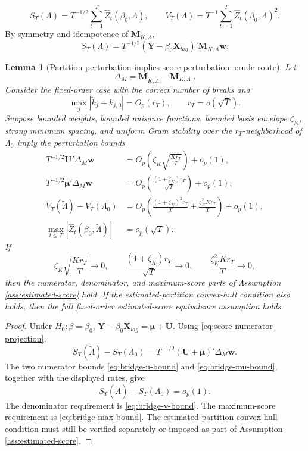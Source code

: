 \documentclass[12pt]{article}
\numberwithin{equation}{section}
\newtheorem{lemma}{Lemma}
\theoremstyle{definition}
\begin{document}
\[
    S_T(\Lambda)
    =
    T^{-1/2}\sum_{t=1}^T\widehat Z_t(\beta_0,\Lambda),
    \qquad
    V_T(\Lambda)
    =
    T^{-1}\sum_{t=1}^T\widehat Z_t(\beta_0,\Lambda)^2.
\]
By symmetry and idempotence of \(\bm M_{K,\Lambda}\),
\begin{equation}
    S_T(\Lambda)
    =
    T^{-1/2}
    (\bm Y-\beta_0\bm X_{lag})'\bm M_{K,\Lambda}\bm w.
    \label{eq:score-numerator-projection}
\end{equation}

\begin{lemma}[Partition perturbation implies score perturbation: crude route]
\label{lem:partition-perturbation}
Let
\[
    \Delta_M
    =
    \bm M_{K,\widetilde\Lambda}-\bm M_{K,\Lambda_0}.
\]
Consider the fixed-order case with the correct number of breaks and
\[
    \max_j|\widetilde k_j-k_{j,0}|=O_p(r_T),
    \qquad
    r_T=o(\sqrt T).
\]
Suppose bounded weights, bounded nuisance functions, bounded basis envelope \(\zeta_K\), strong minimum spacing, and uniform Gram stability over the \(r_T\)-neighborhood of \(\Lambda_0\) imply the perturbation bounds
\begin{align}
    T^{-1/2}\bm U'\Delta_M\bm w
    &=
    O_p\!\left(\zeta_K\sqrt{\frac{K r_T}{T}}\right)+o_p(1),
    \label{eq:bridge-u-bound}\\
    T^{-1/2}\bm\mu'\Delta_M\bm w
    &=
    O_p\!\left(\frac{(1+\zeta_K)r_T}{\sqrt T}\right)+o_p(1),
    \label{eq:bridge-mu-bound}\\
    V_T(\widetilde\Lambda)-V_T(\Lambda_0)
    &=
    O_p\!\left(
      \frac{(1+\zeta_K)^2r_T}{T}
      +
      \frac{\zeta_K^2K r_T}{T}
    \right)+o_p(1),
    \label{eq:bridge-v-bound}\\
    \max_{t\leq T}|\widehat Z_t(\beta_0,\widetilde\Lambda)|
    &=o_p(\sqrt T).
    \label{eq:bridge-max-bound}
\end{align}
If
\[
    \zeta_K\sqrt{\frac{K r_T}{T}}\to0,
    \qquad
    \frac{(1+\zeta_K)r_T}{\sqrt T}\to0,
    \qquad
    \frac{\zeta_K^2K r_T}{T}\to0,
\]
then the numerator, denominator, and maximum-score parts of Assumption \ref{ass:estimated-score} hold. If the estimated-partition convex-hull condition also holds, then the full fixed-order estimated-score equivalence assumption holds.
\end{lemma}

\begin{proof}
Under \(H_0:\beta=\beta_0\), \(\bm Y-\beta_0\bm X_{lag}=\bm\mu+\bm U\). Using \eqref{eq:score-numerator-projection},
\[
    S_T(\widetilde\Lambda)-S_T(\Lambda_0)
    =
    T^{-1/2}(\bm U+\bm\mu)'\Delta_M\bm w.
\]
The two numerator bounds \eqref{eq:bridge-u-bound} and \eqref{eq:bridge-mu-bound}, together with the displayed rates, give
\[
    S_T(\widetilde\Lambda)-S_T(\Lambda_0)=o_p(1).
\]
The denominator requirement is \eqref{eq:bridge-v-bound}. The maximum-score requirement is \eqref{eq:bridge-max-bound}. The estimated-partition convex-hull condition must still be verified separately or imposed as part of Assumption \ref{ass:estimated-score}.
\end{proof}
\end{document}
